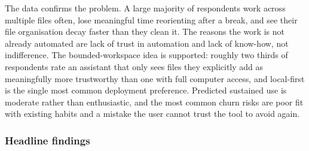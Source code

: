 \documentclass[11pt]{article}
\begin{document}
The data confirms the problem. A large majority of respondents work across multiple files
often, lose meaningful time reorienting after a break, and see their file organisation decay
faster than they clean it. The reasons the work is not already automated are lack of trust in
automation and lack of know-how, not indifference. The bounded-workspace idea is supported:
roughly two thirds of respondents rate an assistant that only sees files they explicitly add
as meaningfully more trustworthy than one with full computer access, and local-first is the
single most common deployment preference. Predicted sustained use is moderate rather than
enthusiastic, and the most common churn risks are poor fit with existing habits and a mistake
the user cannot trust the tool to avoid again.

\subsubsection*{Headline findings}
\end{document}
